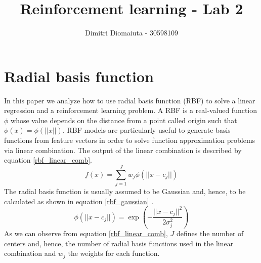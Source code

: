 \documentclass[runningheads]{llncs}
\begin{document}
%
\title{Reinforcement learning - Lab 2}
%
%
\author{Dimitri Diomaiuta - 30598109}
%
%
%
\maketitle              %
%
%
%
%
\section{Radial basis function}\label{RBF}
In this paper we analyze how to use radial basis function (RBF) to
solve a linear regression and a reinforcement learning problem. A RBF
is a real-valued function $\phi$ whose value depends on the distance
from a point called origin such that $\phi(x) = \phi(||x||)$. RBF
models are particularly useful to generate basis functions from
feature vectors in order to solve function approximation problems via
linear combination. The output of the linear combination is described
by equation \ref{rbf_linear_comb}.
\begin{equation}\label{rbf_linear_comb}
  f(x) = \sum_{j=1}^{J}w_j\phi(||x-c_j||)
\end{equation}
The radial basis function is usually assumed to be Gaussian and,
hence, to be calculated as shown in equation \ref{rbf_gaussian}
\cite{rlbook}.
\begin{equation}\label{rbf_gaussian}
\phi(||x-c_j||) = \exp\left(-\frac{||x-c_j||^2}{2\sigma^2_j}\right)
\end{equation}
As we can observe from equation \ref{rbf_linear_comb}, $J$ defines the
number of centers and, hence, the number of radial basis functions used
in the linear combination and $w_j$ the weights for each function.
\end{document}
